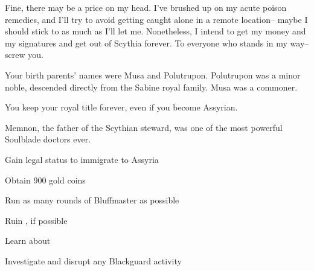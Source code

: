 \documentclass[char]{Kos}
\begin{document}
Fine, there may be a price on my head. I've brushed up on my acute poison remedies, and I'll try to avoid getting caught alone in a remote location-- maybe I should stick to \cPoet{} as much as \cPoet{\they}I'll let me. Nonetheless, I intend to get my money and my signatures and get out of Scythia forever. To everyone who stands in my way-- screw you.

\begin{itemz}[Notes]
  \item Your birth parents' names were Musa and Polutrupon. Polutrupon was a minor noble, descended directly from the Sabine royal family. Musa was a commoner.
  \item You keep your royal title forever, even if you become Assyrian.
  \item Memnon, the father of the Scythian steward, was one of the most powerful Soulblade doctors ever.
\end{itemz}

\begin{itemz}[Goals]
\item Gain legal status to immigrate to Assyria
\item Obtain 900 gold coins
\item Run as many rounds of Bluffmaster as possible
\item Ruin \cBride{}, if possible
\item Learn about \cAnarchist{}
\item Investigate and disrupt any Blackguard activity
\end{itemz}
\end{document}
